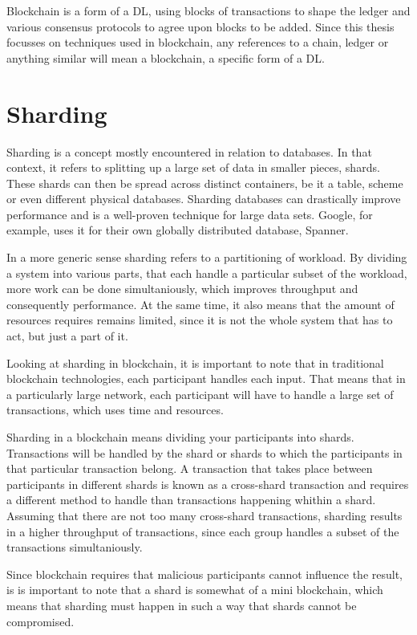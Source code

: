 \documentclass[12pt]{report}
\theoremstyle{plain}
\theoremstyle{definition}
\begin{document}
	Blockchain is a form of a DL, using blocks of transactions to shape the ledger and various consensus protocols to agree upon blocks to be added. Since this thesis focusses on techniques used in blockchain, any references to a chain, ledger or anything similar will mean a blockchain, a specific form of a DL.
	
	\section{Sharding}
	Sharding is a concept mostly encountered in relation to databases. In that context, it refers to splitting up a large set of data in smaller pieces, shards. These shards can then be spread across distinct containers, be it a table, scheme or even different physical databases. Sharding databases can drastically improve performance and is a well-proven technique for large data sets. Google, for example, uses it for their own globally distributed database, Spanner\cite{spanner}.
	
	In a more generic sense sharding refers to a partitioning of workload. By dividing a system into various parts, that each handle a particular subset of the workload, more work can be done simultaniously, which improves throughput and consequently performance. At the same time, it also means that the amount of resources requires remains limited, since it is not the whole system that has to act, but just a part of it.
	
	Looking at sharding in blockchain\cite{omniledger}, it is important to note that in traditional blockchain technologies, each participant handles each input. That means that in a particularly large network, each participant will have to handle a large set of transactions, which uses time and resources.
	
	Sharding in a blockchain means dividing your participants into shards. Transactions will be handled by the shard or shards to which the participants in that particular transaction belong. A transaction that takes place between participants in different shards is known as a cross-shard transaction and requires a different method to handle than transactions happening whithin a shard. Assuming that there are not too many cross-shard transactions, sharding results in a higher throughput of transactions, since each group handles a subset of the transactions simultaniously.
	
	Since blockchain requires that malicious participants cannot influence the result, is is important to note that a shard is somewhat of a mini blockchain, which means that sharding must happen in such a way that shards cannot be compromised.
	
	
\end{document}
